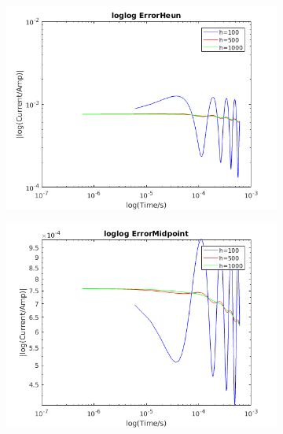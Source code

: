 \documentclass[a4paper, 12pt]{article}
\begin{document}
\begin{figure}
\centering
      \begin{subfigure}{0.32\textwidth}
      \includegraphics[width=\textwidth]{ex2/loglogerrorheun.png}
      \end{subfigure}
      \begin{subfigure}{0.32\textwidth}
      \includegraphics[width=\textwidth]{ex2/loglogerrormidpoint.png}
      \end{subfigure}
      \begin{subfigure}{0.32\textwidth}

\end{subfigure}
\end{figure}
\end{document}

